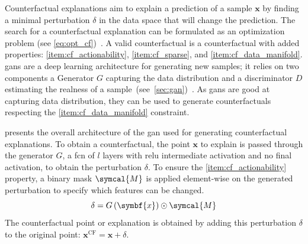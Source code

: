 \documentclass[../main.tex]{subfiles}
\begin{document}
		Counterfactual explanations aim to explain a prediction of a sample \(\symbf{x}\) by finding a minimal perturbation \(\delta\) in the data space that will change the prediction.
		The search for a counterfactual explanation can be formulated as an optimization problem (see \cref{eq:opt_cf})~\cite{wachter2017counterfactual}.
		A valid counterfactual is a counterfactual with added properties: \ref{item:cf_actionability}, \ref{item:cf_sparse}, and \ref{item:cf_data_manifold}.
		\Glspl{gan} are a deep learning architecture for generating new samples; it relies on two components a Generator \(G\) capturing the data distribution and a discriminator \(D\) estimating the realness of a sample~(see~\cref{sec:gan})~\cite{Goodfellow2014GAN}.
		As \glspl{gan} are good at capturing data distribution, they can be used to generate counterfactuals respecting the \ref{item:cf_data_manifold} constraint.

		 presents the overall architecture of the \gls{gan} used for generating counterfactual explanations.
		To obtain a counterfactual, the point \(\symbf{x}\) to explain is passed through the generator \(G\), a \gls{fcn} of \(l\) layers with \gls{relu} intermediate activation and no final activation, to obtain the perturbation \(\delta\).
		To ensure the \ref{item:cf_actionability} property, a binary mask \(\symcal{M}\) is applied element-wise on the generated perturbation to specify which features can be changed.
		\begin{equation}
			\delta = G\left(\symbf{x}\right) \odot \symcal{M}
		\end{equation}
		The counterfactual point or explanation is obtained by adding this perturbation \(\delta\) to the original point: \(\symbf{x}^{\text{CF}} = \symbf{x} + \delta\).
\end{document}
